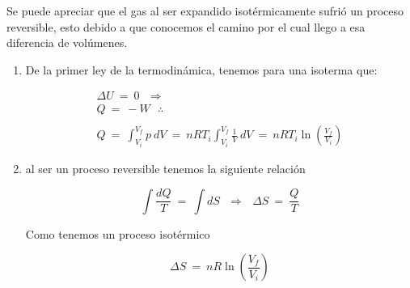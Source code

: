 
Se puede apreciar que el gas al ser expandido isotérmicamente sufrió un proceso reversible, esto debido a que
conocemos el camino por el cual llego a esa diferencia de volúmenes.

\begin{enumerate}[label=\textbf{\alph*)}]
    \item{De la primer ley de la termodinámica, tenemos para una isoterma que:
    
    \begin{gather*}
        \Delta U\ =\ 0\ \ \ \Rightarrow\\
        Q\ =\ -W\ \ \ \therefore\\
        \\
        Q\ =\ \int_{V_{i}}^{V_{f}} p\ dV\ =\ nRT_{i} \int_{V_{i}}^{V_{f}} \frac{1}{V}\ dV\ =\ 
        \boxed{nRT_{i} \ln{\left(\frac{V_{f}}{V_{i}}\right)}}
    \end{gather*}
     } 

    \item{ al ser un proceso reversible tenemos la siguiente relación 
    
    \begin{equation}
        \int \frac{dQ}{T}\ =\ \int dS\ \ \ \Rightarrow\ \ \  \Delta S\ =\ \frac{Q}{T}
    \end{equation}
    
    Como tenemos un proceso isotérmico 

    \begin{equation*}   
        \boxed{\Delta S\ =\ nR\ln{\left(\frac{V_{f}}{V_{i}}\right)}}
    \end{equation*}
    }
\end{enumerate}
